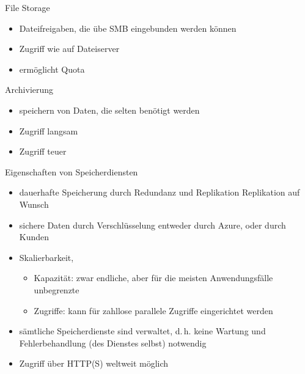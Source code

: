\begin{flashcard}[Definition]{File Storage}
    \begin{itemize}
        \item Dateifreigaben, die übe SMB eingebunden werden können
        \item Zugriff wie auf Dateiserver
        \item ermöglicht Quota
    \end{itemize}
\end{flashcard}

\begin{flashcard}[Definition]{Archivierung}
    \begin{itemize}
        \item speichern von Daten, die selten benötigt werden
        \item Zugriff langsam
        \item Zugriff teuer
    \end{itemize}
\end{flashcard}

\begin{flashcard}[\ ]{Eigenschaften von Speicherdiensten}
    \begin{itemize}
        \item dauerhafte Speicherung durch Redundanz und Replikation\newline
        Replikation auf Wunsch
        \item sichere Daten durch Verschlüsselung\newline
        entweder durch Azure, oder durch Kunden
        \item Skalierbarkeit,
        \begin{itemize}
            \item Kapazität: zwar endliche, aber für die meisten Anwendungsfälle unbegrenzte
            \item Zugriffe: kann für zahllose parallele Zugriffe eingerichtet werden
        \end{itemize}
        \item sämtliche Speicherdienste sind verwaltet, d.\,h. keine Wartung und Fehlerbehandlung (des Dienstes selbst) notwendig
        \item Zugriff über HTTP(S) weltweit möglich
    \end{itemize}
\end{flashcard}

